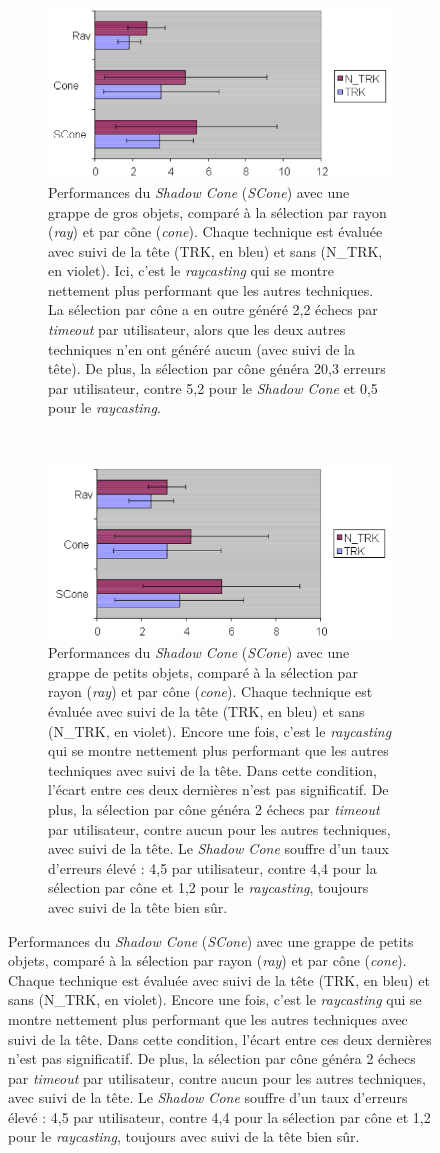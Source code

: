 		
	\begin{figure}[!htb]
		\begin{subfigure}[t]{0.49\textwidth}
			\centering
			\includegraphics[width=\textwidth]{figures/ch2/shadowCLarge}
			\caption{Performances du \emph{Shadow Cone} (\emph{SCone}) avec une grappe de gros objets, comparé à la sélection par rayon (\emph{ray}) et par cône (\emph{cone}). Chaque technique est évaluée avec suivi de la tête (TRK, en bleu) et sans (N\_{}TRK, en violet). Ici, c'est le \emph{raycasting} qui se montre nettement plus performant que les autres techniques. La sélection par cône a en outre généré 2,2 échecs par \emph{timeout} par utilisateur, alors que les deux autres techniques n'en ont généré aucun (avec suivi de la tête). De plus, la sélection par cône généra 20,3 erreurs par utilisateur, contre 5,2 pour le \emph{Shadow Cone} et 0,5 pour le \emph{raycasting}.}
			\label{fig:shadowCLarge}
		\end{subfigure}
		~
		\begin{subfigure}[t]{0.49\textwidth}
			\centering
			\includegraphics[width=\textwidth]{figures/ch2/shadowCSmall}
			\caption{Performances du \emph{Shadow Cone} (\emph{SCone}) avec une grappe de petits objets, comparé à la sélection par rayon (\emph{ray}) et par cône (\emph{cone}). Chaque technique est évaluée avec suivi de la tête (TRK, en bleu) et sans (N\_{}TRK, en violet). Encore une fois, c'est le \emph{raycasting} qui se montre nettement plus performant que les autres techniques avec suivi de la tête. Dans cette condition, l'écart entre ces deux dernières n'est pas significatif. De plus, la sélection par cône généra 2 échecs par \emph{timeout} par utilisateur, contre aucun pour les autres techniques, avec suivi de la tête. Le \emph{Shadow Cone} souffre d'un taux d'erreurs élevé : 4,5 par utilisateur, contre 4,4 pour la sélection par cône et 1,2 pour le \emph{raycasting}, toujours avec suivi de la tête bien sûr.}

\end{subfigure}
\end{figure}
